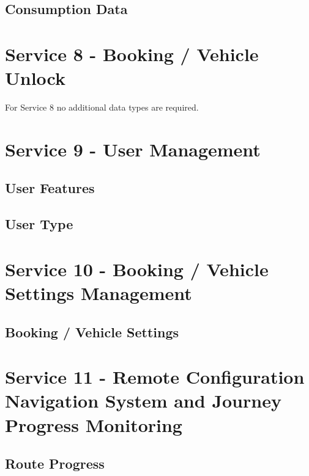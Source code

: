 \subsection*{Consumption Data}



\section{Service 8 - Booking / Vehicle Unlock}
\label{sec:Datenmodell:Dienst8}
For Service 8 no additional data types are required.

\section{Service 9 - User Management}
\label{sec:Datenmodell:Dienst9}

\subsection*{User Features}



\subsection*{User Type}



\section{Service 10 - Booking / Vehicle Settings Management}
\label{sec:Datenmodell:Dienst10}

\subsection*{Booking / Vehicle Settings}



\section{Service 11 - Remote Configuration Navigation System and Journey Progress Monitoring}
\label{sec:Datenmodell:Dienst11}

\subsection*{Route Progress}



